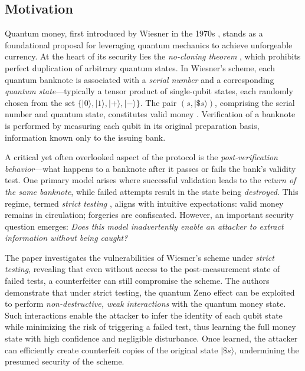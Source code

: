 \documentclass{article} %
\begin{document}
\subsection{Motivation}

Quantum money, first introduced by Wiesner in the 1970s \citep{Wiesner1983Conjugate}, stands as a foundational proposal for leveraging quantum mechanics to achieve unforgeable currency. At the heart of its security lies the \emph{no-cloning theorem} \citep{WoottersZurek1982Single}, which prohibits perfect duplication of arbitrary quantum states. In Wiesner’s scheme, each quantum banknote is associated with a \emph{serial number} and a corresponding \emph{quantum state}—typically a tensor product of single-qubit states, each randomly chosen from the set $\{|0\rangle, |1\rangle, |+\rangle, |-\rangle\}$. The pair $(s, |\$s\rangle)$, comprising the serial number and quantum state, constitutes valid money \citep{Wiesner1983Conjugate}. Verification of a banknote is performed by measuring each qubit in its original preparation basis, information known only to the issuing bank.

A critical yet often overlooked aspect of the protocol is the \emph{post-verification behavior}—what happens to a banknote after it passes or fails the bank's validity test. One primary model arises where successful validation leads to the \emph{return of the same banknote}, while failed attempts result in the state being \emph{destroyed}. This regime, termed \emph{strict testing} \citep{Nagaj2016Adaptive}, aligns with intuitive expectations: valid money remains in circulation; forgeries are confiscated. However, an important security question emerges: \textit{Does this model inadvertently enable an attacker to extract information without being caught?}

The paper \citep{Nagaj2016Adaptive} investigates the vulnerabilities of Wiesner’s scheme under \emph{strict testing}, revealing that even without access to the post-measurement state of failed tests, a counterfeiter can still compromise the scheme. The authors demonstrate that under strict testing, the quantum Zeno effect can be exploited to perform \emph{non-destructive, weak interactions} with the quantum money state. Such interactions enable the attacker to infer the identity of each qubit state while minimizing the risk of triggering a failed test, thus learning the full money state with high confidence and negligible disturbance. Once learned, the attacker can efficiently create counterfeit copies of the original state $|\$s\rangle$, undermining the presumed security of the scheme.
\newpage
\end{document}
